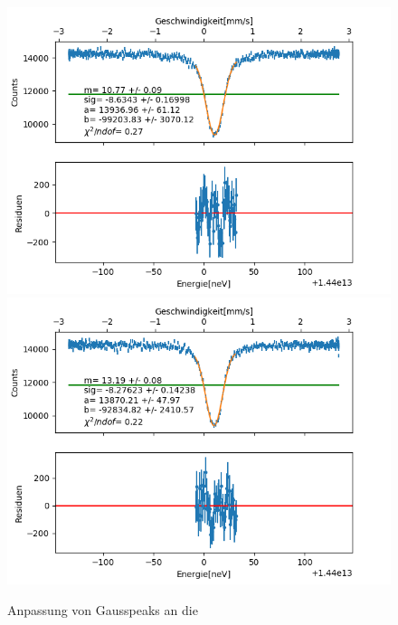 \documentclass[12pt,a4paper]{article}
\begin{document}
\begin{figure}
\centering
\includegraphics[scale=0.8]{Bilder/Einlinien/Ein_halbgauss_vor.png}
\includegraphics[scale=0.8]{Bilder/Einlinien/Ein_halbgauss_nach.png}
\caption{Anpassung von Gausspeaks an die }
\label{fig:Ein_halbgauss}
\end{figure}
\end{document}
